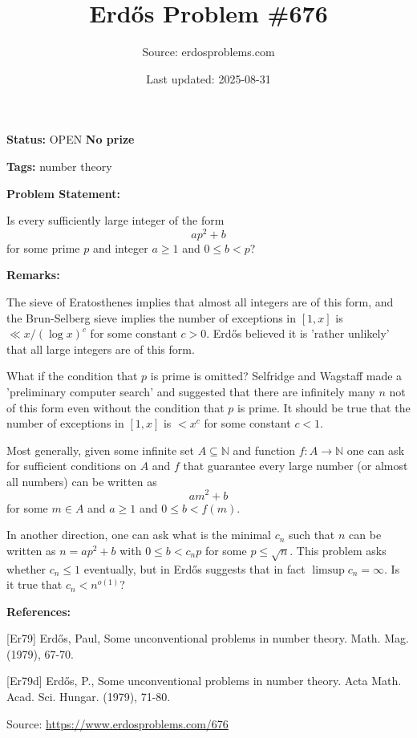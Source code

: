 \documentclass{article}
\title{Erd\H{o}s Problem \#676}
\date{Last updated: 2025-08-31}
\author{Source: erdosproblems.com}
\begin{document}
\maketitle

\noindent\textbf{Status:} OPEN \quad \textbf{No prize}

\noindent\textbf{Tags:} number theory

\medskip
\noindent\textbf{Problem Statement:}

Is every sufficiently large integer of the form\[ap^2+b\]for some prime $p$ and integer $a\geq 1$ and $0\leq b<p$?

\bigskip
\noindent\textbf{Remarks:}

The sieve of Eratosthenes implies that almost all integers are of this form, and the Brun-Selberg sieve implies the number of exceptions in $[1,x]$ is $\ll x/(\log x)^c$ for some constant $c>0$. Erd\H{o}s \cite{Er79} believed it is 'rather unlikely' that all large integers are of this form.

What if the condition that $p$ is prime is omitted? Selfridge and Wagstaff made a 'preliminary computer search' and suggested that there are infinitely many $n$ not of this form even without the condition that $p$ is prime. It should be true that the number of exceptions in $[1,x]$ is $<x^c$ for some constant $c<1$.

Most generally, given some infinite set $A\subseteq \mathbb{N}$ and function $f:A\to \mathbb{N}$ one can ask for sufficient conditions on $A$ and $f$ that guarantee every large number (or almost all numbers) can be written as\[am^2+b\]for some $m\in A$ and $a\geq 1$ and $0\leq b<f(m)$.

In another direction, one can ask what is the minimal $c_n$ such that $n$ can be written as $n=ap^2+b$ with $0\leq b<c_np$ for some $p\leq \sqrt{n}$. This problem asks whether $c_n\leq 1$ eventually, but in \cite{Er79d} Erd\H{o}s suggests that in fact $\limsup c_n=\infty$. Is it true that $c_n<n^{o(1)}$?

\bigskip
\noindent\textbf{References:}

[Er79] Erd\H{o}s, Paul, Some unconventional problems in number theory. Math. Mag. (1979), 67-70.
 
 [Er79d] Erd\H{o}s, P., Some unconventional problems in number theory. Acta Math. Acad. Sci. Hungar. (1979), 71-80.

\bigskip
\noindent\small{Source: \url{https://www.erdosproblems.com/676}}
\end{document}
